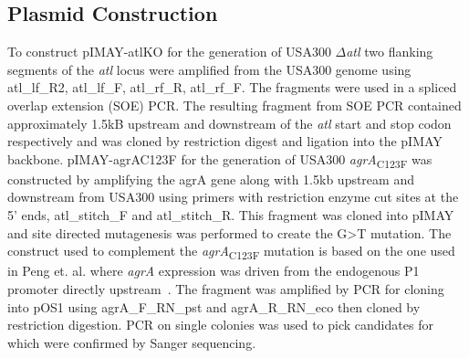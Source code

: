 \documentclass[10pt,letterpaper]{article}
\begin{document}
\subsection*{Plasmid Construction}
To construct pIMAY-atlKO for the generation of USA300 $\Delta$\textit{atl} two flanking segments of the \textit{atl} locus were amplified from the USA300 genome using atl\_lf\_R2, atl\_lf\_F, atl\_rf\_R, atl\_rf\_F.
The fragments were used in a spliced overlap extension (SOE) PCR.
The resulting fragment from SOE PCR contained approximately 1.5kB upstream and downstream of the \textit{atl} start and stop codon respectively and was cloned by restriction digest and ligation into the pIMAY backbone.
pIMAY-agrAC123F for the generation of USA300 \textit{agrA}\textsubscript{C123F} was constructed by amplifying the agrA gene along with 1.5kb upstream and downstream from USA300 using primers with restriction enzyme cut sites at the 5' ends, atl\_stitch\_F and atl\_stitch\_R.
This fragment was cloned into pIMAY and site directed mutagenesis was performed to create the G\textgreater T mutation.
The construct used to complement the \textit{agrA}\textsubscript{C123F} mutation is based on the one used in Peng et. al. where \textit{agrA} expression was driven from the endogenous P1 promoter directly upstream~\cite{peng_cloning_1988}.
The fragment was amplified by PCR for cloning into pOS1 using agrA\_F\_RN\_pst and agrA\_R\_RN\_eco then cloned by restriction digestion.
PCR on single colonies was used to pick candidates for which were confirmed by Sanger sequencing.
\end{document}
